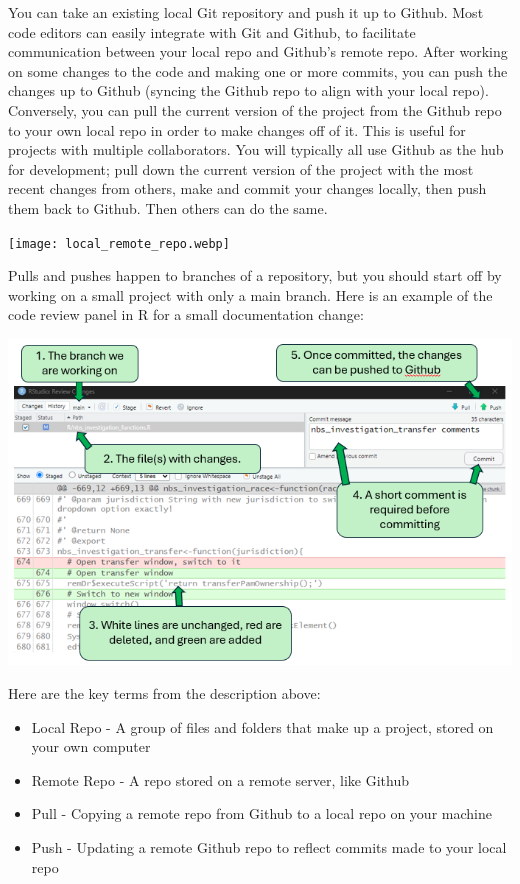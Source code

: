 \documentclass[
  letterpaper,
  DIV=11,
  numbers=noendperiod]{scrreprt}
\begin{document}
You can take an existing local Git repository and push it up to Github.
Most code editors can easily integrate with Git and Github, to
facilitate communication between your local repo and Github's remote
repo. After working on some changes to the code and making one or more
commits, you can push the changes up to Github (syncing the Github repo
to align with your local repo). Conversely, you can pull the current
version of the project from the Github repo to your own local repo in
order to make changes off of it. This is useful for projects with
multiple collaborators. You will typically all use Github as the hub for
development; pull down the current version of the project with the most
recent changes from others, make and commit your changes locally, then
push them back to Github. Then others can do the same.

\texttt{[image: local\_remote\_repo.webp]}

Pulls and pushes happen to branches of a repository, but you should
start off by working on a small project with only a main branch. Here is
an example of the code review panel in R for a small documentation
change:

\includegraphics{images/commit_review_R.png}

Here are the key terms from the description above:

\begin{itemize}
\item
  Local Repo - A group of files and folders that make up a project,
  stored on your own computer
\item
  Remote Repo - A repo stored on a remote server, like Github
\item
  Pull - Copying a remote repo from Github to a local repo on your
  machine
\item
  Push - Updating a remote Github repo to reflect commits made to your
  local repo
\end{itemize}
\end{document}
